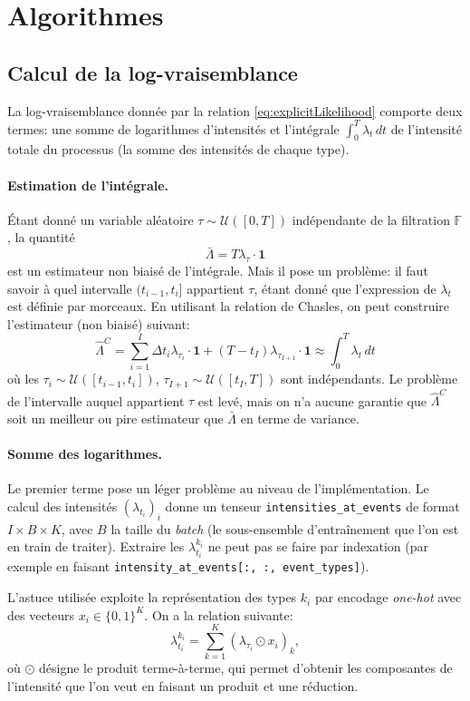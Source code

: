 \documentclass[../main.tex]{subfiles}
\begin{document}
\section{Algorithmes}\label{sec:algoAppendix}

\subsection{Calcul de la log-vraisemblance}

La log-vraisemblance donnée par la relation \eqref{eq:explicitLikelihood} comporte deux termes: une somme de logarithmes d'intensités et l'intégrale $\int_0^T\lambda_t\,dt$ de l'intensité totale du processus (la somme des intensités de chaque type).

\paragraph{Estimation de l'intégrale.} Étant donné un variable aléatoire $\tau\sim\mathcal{U}([0,T])$ indépendante de la filtration $\mathds{F}$, la quantité 
\[
\bar{\Lambda} = T\lambda_\tau\cdot\mathbf 1
\]
est un estimateur non biaisé de l'intégrale. Mais il pose un problème: il faut savoir à quel intervalle $(t_{i-1}, t_i]$ appartient $\tau$, étant donné que l'expression de $\lambda_t$ est définie par morceaux. En utilisant la relation de Chasles, on peut construire l'estimateur (non biaisé) suivant:
\begin{equation}
\hat{\Lambda}^C = \sum_{i=1}^{I} \Delta t_i\lambda_{\tau_i} \cdot \mathbf{1} + (T-t_{I})\lambda_{\tau_{I+1}}\cdot\mathbf{1}
\approx
\int_0^T \lambda_t\,dt
\end{equation}
où les $\tau_i\sim\mathcal{U}([t_{i-1}, t_i])$, $\tau_{I+1}\sim\mathcal{U}([t_I, T])$ sont indépendants. Le problème de l'intervalle auquel appartient $\tau$ est levé, mais on n'a aucune garantie que $\hat{\Lambda}^C$ soit un meilleur ou pire estimateur que $\bar{\Lambda}$ en terme de variance.

\paragraph{Somme des logarithmes.} Le premier terme pose un léger problème au niveau de l'implémentation. Le calcul des intensités ${(\lambda_{t_i})}_i$ donne un tenseur \verb|intensities_at_events| de format $I\times B\times K$, avec $B$ la taille du \textit{batch} (le sous-ensemble d'entraînement que l'on est en train de traiter). Extraire les $\lambda^{k_i}_{t_i}$ ne peut pas se faire par indexation (par exemple en faisant \verb|intensity_at_events[:, :, event_types]|).

L'astuce utilisée exploite la représentation des types $k_i$ par encodage \textit{one-hot} avec des vecteurs $x_i\in{\{0,1\}}^K$. On a la relation suivante:
\[
\lambda^{k_i}_{t_i} = \sum_{k=1}^K {(\lambda_{\tau_i} \odot x_i)}_k,
\]
où $\odot$ désigne le produit terme-à-terme, qui permet d'obtenir les composantes de l'intensité que l'on veut en faisant un produit et une réduction.
\end{document}
